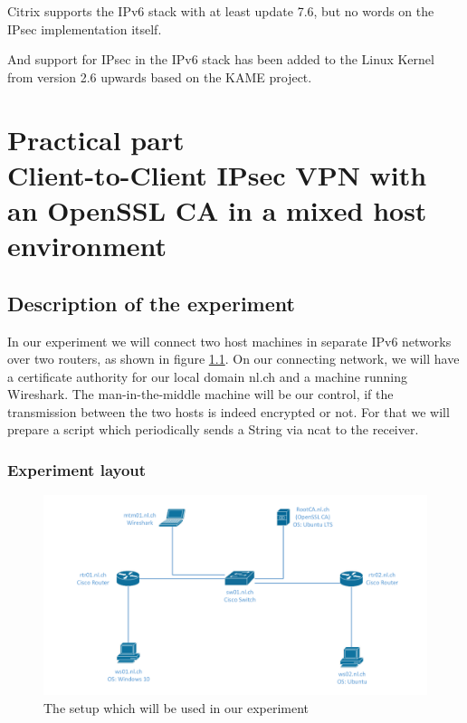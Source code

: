 \documentclass[a4paper]{report}
\begin{document}
Citrix supports the IPv6 stack with at least update 7.6, but no words on the IPsec implementation itself. \parencite{Citrix2015}

And support for IPsec in the IPv6 stack has been added to the Linux Kernel from version 2.6 upwards based on the KAME project. \parencite{Spenneberg2003}

\chapter[Practical part\\Client-to-Client IPsec VPN with an OpenSSL CA in a mixed host environment]{Practical part\\\large{Client-to-Client IPsec VPN with an OpenSSL CA in a mixed host environment}}
\label{ch:Practical}

\section{Description of the experiment}
\label{sec:ExpDesc}

In our experiment we will connect two host machines in separate IPv6 networks over two routers, as shown in figure \ref{fig:exp_layout}. On our connecting network, we will have a certificate authority for our local domain nl.ch and a machine running Wireshark. The man-in-the-middle machine will be our control, if the transmission between the two hosts is indeed encrypted or not. For that we will prepare a script which periodically sends a String via ncat to the receiver.

\subsection{Experiment layout}
\label{ssec:ExpLayout}

\begin{figure}[htb]
	\includegraphics[keepaspectratio, width = \linewidth]{experiment_layout}
	\caption{The setup which will be used in our experiment}
	\label{fig:exp_layout}
\end{figure}
\end{document}
